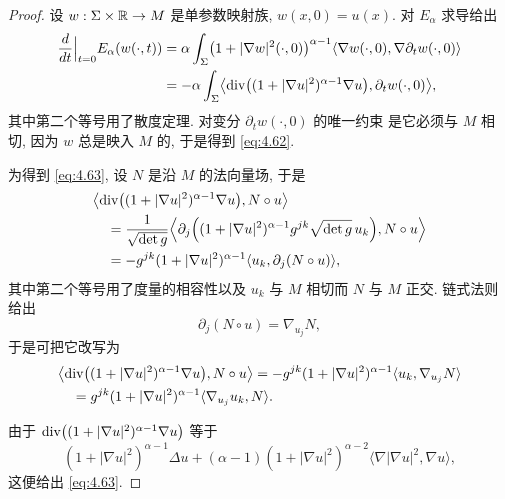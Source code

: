 \begin{proof}
设 $w:\Sigma\times\mathbb{R}\to M$ 是单参数映射族, $w(x,0)=u(x)$. 对
$E_\alpha$ 求导给出
\begin{equation}
\begin{aligned}
\frac{d}{dt}\Big|_{t=0}E_\alpha(w(\cdot,t))
&=\alpha\int_\Sigma\bigl(1+|\nabla w|^2(\cdot,0)\bigr)^{\alpha-1}
 \langle\nabla w(\cdot,0),\nabla\partial_tw(\cdot,0)\rangle\\
&=-\alpha\int_\Sigma\bigl\langle
 \operatorname{div}\bigl((1+|\nabla u|^2)^{\alpha-1}\nabla u\bigr),
 \partial_tw(\cdot,0)\bigr\rangle,
\end{aligned}
\label{eq:4.64}
\end{equation}
其中第二个等号用了散度定理. 对变分 $\partial_tw(\cdot,0)$ 的唯一约束
是它必须与 $M$ 相切, 因为 $w$ 总是映入 $M$ 的, 于是得到 \eqref{eq:4.62}.

为得到 \eqref{eq:4.63}, 设 $N$ 是沿 $M$ 的法向量场, 于是
\begin{equation}
\begin{aligned}
&\bigl\langle\operatorname{div}\bigl((1+|\nabla u|^2)^{\alpha-1}\nabla u\bigr),
 N\circ u\bigr\rangle\\
&\quad=\frac1{\sqrt{\det g}}\Bigl\langle\partial_j\Bigl(
 (1+|\nabla u|^2)^{\alpha-1}g^{jk}\sqrt{\det g}\,u_k\Bigr),
 N\circ u\Bigr\rangle\\
&\quad=-g^{jk}(1+|\nabla u|^2)^{\alpha-1}
 \langle u_k,\partial_j(N\circ u)\rangle,
\end{aligned}
\label{eq:4.65}
\end{equation}
其中第二个等号用了度量的相容性以及 $u_k$ 与 $M$ 相切而 $N$ 与 $M$
正交. 链式法则给出
\begin{equation}
\partial_j(N\circ u)=\nabla_{u_j}N,
\label{eq:4.66}
\end{equation}
于是可把它改写为
\begin{equation}
\begin{aligned}
&\bigl\langle\operatorname{div}\bigl((1+|\nabla u|^2)^{\alpha-1}\nabla u\bigr),
 N\circ u\bigr\rangle
 =-g^{jk}(1+|\nabla u|^2)^{\alpha-1}\langle u_k,\nabla_{u_j}N\rangle\\
&\quad=g^{jk}(1+|\nabla u|^2)^{\alpha-1}
 \langle\nabla_{u_j}u_k,N\rangle.
\end{aligned}
\label{eq:4.67}
\end{equation}

由于
$\operatorname{div}\bigl((1+|\nabla u|^2)^{\alpha-1}\nabla u\bigr)$ 等于
\begin{equation}
(1+|\nabla u|^2)^{\alpha-1}\Delta u
 +(\alpha-1)(1+|\nabla u|^2)^{\alpha-2}
 \bigl\langle\nabla|\nabla u|^2,\nabla u\bigr\rangle,
\label{eq:4.68}
\end{equation}
这便给出 \eqref{eq:4.63}.
\end{proof}

